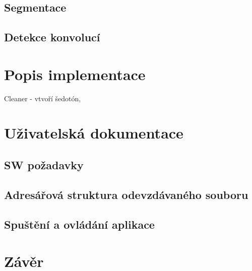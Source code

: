 \documentclass[12pt, a4paper]{report}
\begin{document}
	\section{Segmentace}
	\section{Detekce konvolucí}


\chapter{Popis implementace}
	Cleaner - vtvoří šedotón, 

\chapter{Uživatelská dokumentace}
	\section{SW požadavky}
	
	\section{Adresářová struktura odevzdávaného souboru}	
	
	\section{Spuštění a ovládání aplikace}	

\chapter{Závěr}
\end{document}
